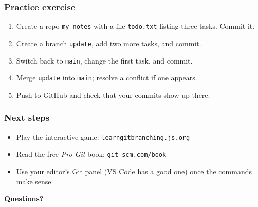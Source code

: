 \documentclass[aspectratio=169,10pt,compress]{beamer}
\begin{document}
\begin{frame}[t,fragile] \frametitle{Practice exercise}
  \begin{enumerate}
    \item Create a repo \texttt{my-notes} with a file \texttt{todo.txt} listing three tasks.
          Commit it.
    \item Create a branch \texttt{update}, add two more tasks, and commit.
    \item Switch back to \texttt{main}, change the first task, and commit.
    \item Merge \texttt{update} into \texttt{main}; resolve a conflict if one appears.
    \item Push to GitHub and check that your commits show up there.
  \end{enumerate}
\end{frame}

\begin{frame}[t,fragile] \frametitle{Next steps}
  \begin{itemize}
    \item Play the interactive game: \texttt{learngitbranching.js.org}
    \item Read the free \emph{Pro Git} book: \texttt{git-scm.com/book}
    \item Use your editor's Git panel (VS Code has a good one) once the commands make sense
  \end{itemize}

  \vspace{2em}
  \begin{center}
    {\Large \textbf{Questions?}}
  \end{center}
\end{frame}
\end{document}
